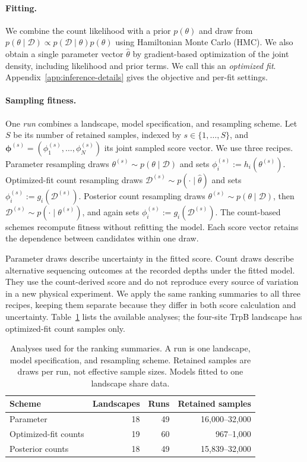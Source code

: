 \documentclass[11pt]{article}
\newcommand{\fit}{\phi}
\newcommand{\data}{\mathcal{D}}
\begin{document}
\paragraph{Fitting.}
We combine the count likelihood with a prior $p(\theta)$ and draw from
$p(\theta\mid\data)\propto p(\data\mid\theta)p(\theta)$ using Hamiltonian
Monte Carlo (HMC). We also obtain a single parameter vector $\hat\theta$
by gradient-based optimization of the joint density, including likelihood
and prior terms. We call this an \emph{optimized fit}.
Appendix~\ref{app:inference-details} gives the objective and per-fit settings.

\paragraph{Sampling fitness.}
One \emph{run} combines a landscape, model specification, and resampling
scheme. Let $S$ be its number of retained samples, indexed by
$s\in\{1,\ldots,S\}$, and
$\boldsymbol{\fit}^{(s)}=(\fit_1^{(s)},\ldots,\fit_N^{(s)})$ its joint
sampled score vector. We use three recipes. Parameter resampling
draws $\theta^{(s)}\sim p(\theta\mid\data)$ and sets
$\fit_i^{(s)}:=h_i(\theta^{(s)})$. Optimized-fit count resampling draws
$\data^{(s)}\sim p(\cdot\mid\hat\theta)$ and sets
$\fit_i^{(s)}:=g_i(\data^{(s)})$. Posterior count resampling draws
$\theta^{(s)}\sim p(\theta\mid\data)$, then
$\data^{(s)}\sim p(\cdot\mid\theta^{(s)})$, and again sets
$\fit_i^{(s)}:=g_i(\data^{(s)})$. The count-based schemes recompute fitness
without refitting the model. Each score vector retains the dependence
between candidates within one draw.

Parameter draws describe uncertainty in the fitted score. Count draws
describe alternative sequencing outcomes at the recorded depths under the
fitted model. They use the count-derived score and do not reproduce every
source of variation in a new physical experiment. We apply the same ranking
summaries to all three recipes, keeping them separate because they differ
in both score calculation and uncertainty. Table~\ref{tab:inventory} lists
the available analyses; the four-site TrpB landscape has optimized-fit
count samples only.

\begin{table}[t]
\centering
\caption{Analyses used for the ranking summaries. A run is one landscape,
model specification, and resampling scheme. Retained samples are draws per
run, not effective sample sizes. Models fitted to one landscape share data.}
\label{tab:inventory}
\begin{tabular}{lrrr}
\toprule
Scheme & Landscapes & Runs & Retained samples \\
\midrule
Parameter & 18 & 49 & 16,000--32,000 \\
Optimized-fit counts & 19 & 60 & 967--1,000 \\
Posterior counts & 18 & 49 & 15,839--32,000 \\
\bottomrule
\end{tabular}
\end{table}
\end{document}
